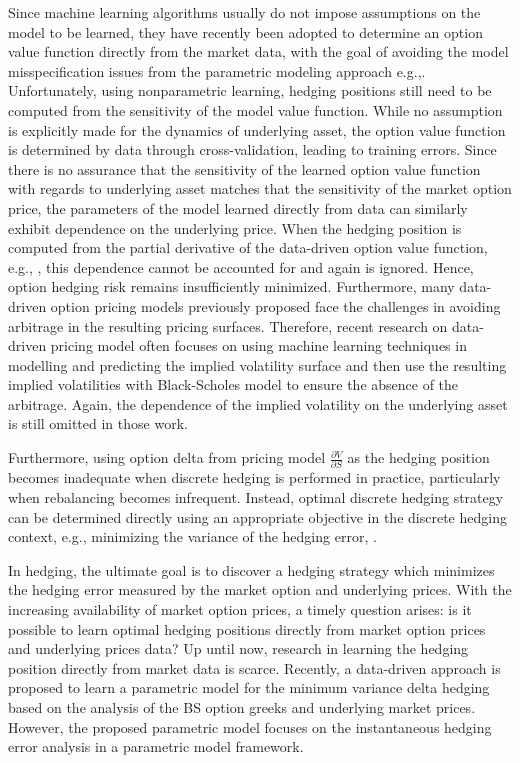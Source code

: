 \documentclass[letterpaper,12pt,titlepage,oneside,final]{book}
\numberwithin{equation}{section}
\theoremstyle{definition}
\begin{document}
Since machine learning algorithms usually do not impose assumptions on the model to be learned, they have recently been adopted to determine an option value function directly from the market data, with the goal of avoiding the model misspecification issues from the parametric modeling approach e.g.,\citep{gradojevic2009option,garcia2000pricing,hutchinson}.
Unfortunately, using nonparametric learning, hedging positions still need to be computed from the sensitivity of the model value function.
While no assumption is explicitly made for the  dynamics of underlying asset, the option value function is determined by data through cross-validation, leading to training errors.
Since there is no assurance that the  sensitivity of the learned option value function  with regards to underlying asset matches that the sensitivity of the market option price,
the parameters of the model learned directly from data can similarly exhibit dependence on the underlying price. When the hedging position is computed from the partial derivative of the data-driven option value function, e.g.,  \citep{hutchinson}, this dependence cannot be accounted for and again is ignored. Hence, option hedging risk remains insufficiently minimized. Furthermore, many data-driven option pricing models previously proposed \citep{gradojevic2009option,garcia2000pricing,hutchinson} face the challenges in avoiding arbitrage in the resulting pricing surfaces. Therefore,  recent research \cite{cao2021option, zheng2021incorporating, liu2019pricing} on data-driven pricing model often focuses on using machine learning techniques in modelling and predicting the implied volatility surface and then use the resulting implied volatilities with Black-Scholes model to ensure the absence of the arbitrage. Again, the dependence of the implied volatility on the underlying asset is still omitted in those work. 

Furthermore, using option delta from pricing model $\frac{\partial V}{\partial S}$ as the hedging position becomes inadequate when discrete hedging is performed in practice, particularly when rebalancing becomes infrequent.  Instead, optimal discrete hedging strategy can be determined directly using an appropriate objective in the discrete hedging context, e.g., minimizing the variance of the hedging error, \citep{hulloptimal,Angelini10,Goutte13}.

In hedging, the ultimate goal is to discover a hedging strategy  which minimizes the hedging error  measured by the market option and underlying prices. With the increasing availability of market option prices, a timely question arises: is it possible to learn optimal hedging positions directly from market option prices and underlying prices data?
Up until now, research in learning the hedging position  directly from market data is scarce.
Recently, a data-driven approach  \citep{hulloptimal} is proposed to learn a parametric model for the minimum variance delta hedging based on the analysis of the BS option greeks and underlying market prices. However, the proposed parametric model focuses on the instantaneous hedging error analysis in a parametric model framework.
\end{document}
